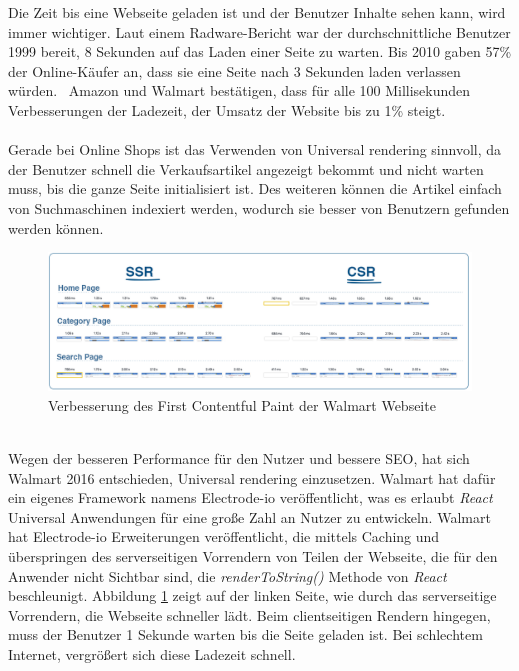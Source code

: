 \documentclass[runningheads]{llncs}
\numberwithin{figure}{section}
\begin{document}
Die Zeit bis eine Webseite geladen ist und der Benutzer Inhalte sehen kann, 
wird immer wichtiger. 
Laut einem Radware-Bericht war der durchschnittliche Benutzer 1999 bereit, 
8 Sekunden auf das Laden einer Seite zu warten. 
Bis 2010 gaben 57\% der Online-Käufer an, dass sie eine Seite nach 3 Sekunden laden verlassen würden. 
Amazon und Walmart bestätigen, dass für alle 100 Millisekunden Verbesserungen der Ladezeit, 
der Umsatz der Website bis zu 1\% steigt. \cite{young} \cite{einav_2019}
\\
\\
Gerade bei Online Shops ist das Verwenden von Universal rendering sinnvoll, 
da der Benutzer schnell die Verkaufsartikel angezeigt bekommt und nicht warten muss, 
bis die ganze Seite initialisiert ist. 
Des weiteren können die Artikel einfach von Suchmaschinen indexiert werden, 
wodurch sie besser von Benutzern gefunden werden können.
\begin{figure}
  \centering
  \includegraphics[width=12cm]{images/ssrvscsrwallmart}
  \caption{Verbesserung des First Contentful Paint der Walmart Webseite}
  \label{Verbesserung des First Contentful Paint der Walmart Webseite}
\end{figure}
\\
Wegen der besseren Performance für den Nutzer und bessere SEO, 
hat sich Walmart 2016 entschieden, 
Universal rendering einzusetzen. 
Walmart hat dafür ein eigenes Framework namens Electrode-io veröffentlicht, 
was es erlaubt \textit{React} Universal Anwendungen für eine große Zahl an Nutzer zu entwickeln. 
Walmart hat Electrode-io Erweiterungen veröffentlicht, 
die mittels Caching und überspringen des serverseitigen Vorrendern von Teilen der Webseite, 
die für den Anwender nicht Sichtbar sind, 
die \textit{renderToString()} Methode von \textit{React} beschleunigt. 
Abbildung \ref{Verbesserung des First Contentful Paint der Walmart Webseite} zeigt auf der linken Seite, 
wie durch das serverseitige Vorrendern, 
die Webseite schneller lädt. Beim clientseitigen Rendern hingegen, 
muss der Benutzer 1 Sekunde warten bis die Seite geladen ist. 
Bei schlechtem Internet, vergrößert sich diese Ladezeit schnell.
\newpage
\end{document}
